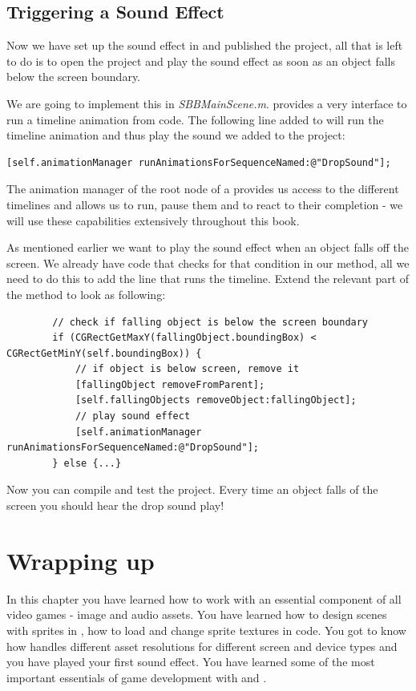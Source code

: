 \subsection{Triggering a Sound Effect}
Now we have set up the sound effect in \SB{} and published the project, all that
is left to do is to open the \xcode{} project and play the sound effect as soon
as an object falls below the screen boundary.

We are going to implement this in \textit{SBBMainScene.m}. \cocos{} provides a
very interface to run a timeline animation from code. The following line added
to  will run the timeline animation and thus play the
sound we added to the project:
\begin{lstlisting}
[self.animationManager runAnimationsForSequenceNamed:@"DropSound"];
\end{lstlisting}
The animation manager of the root node of a \ccbfile{} provides us access to the
different timelines and allows us to run, pause them and to react to their
completion - we will use these capabilities extensively throughout this book.

As mentioned earlier we want to play the sound effect when an object falls off
the screen. We already have code that checks for that condition in our
 method, all we need to do this to add the line that runs the
timeline. Extend the relevant part of the  method to look as
following:
\begin{lstlisting}
        // check if falling object is below the screen boundary
        if (CGRectGetMaxY(fallingObject.boundingBox) < CGRectGetMinY(self.boundingBox)) {
            // if object is below screen, remove it
            [fallingObject removeFromParent];
            [self.fallingObjects removeObject:fallingObject];
            // play sound effect
            [self.animationManager runAnimationsForSequenceNamed:@"DropSound"];
        } else {...}
\end{lstlisting}
Now you can compile and test the project. Every time an object falls of the
screen you should hear the drop sound play!
\section{Wrapping up}
In this chapter you have learned how to work with an essential component of all
video games - image and audio assets. You have learned how to design scenes with
sprites in \SB{}, how to load and change sprite textures in code. You got to
know how \SB{} handles different asset resolutions for different screen and
device types and you have played your first sound effect. You have learned some
of the most important essentials of game development with \SB{} and \cocos{}.

